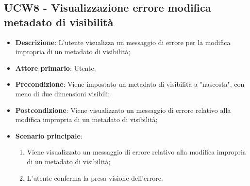 \subsection{UCW8 - Visualizzazione errore modifica metadato di visibilità}
\label{sub:ucw8}

\begin{itemize}
    \item \textbf{Descrizione}: L'utente visualizza un messaggio di errore per la modifica impropria di un metadato di 
    visibilità;

    \item \textbf{Attore primario}: Utente;
    
    \item \textbf{Precondizione}:   Viene impostato un metadato di visibilità a "nascosta", con meno di due dimensioni 
    visibili;

    \item \textbf{Postcondizione}:   Viene visualizzato un messaggio di errore relativo alla modifica impropria di un 
    metadato di visibilità;

    \item \textbf{Scenario principale}:
    \begin{enumerate}
        \item Viene visualizzato un messaggio di errore relativo alla modifica impropria di un metadato di visibilità;
        \item L'utente conferma la presa visione dell'errore.
    \end{enumerate}
\end{itemize}